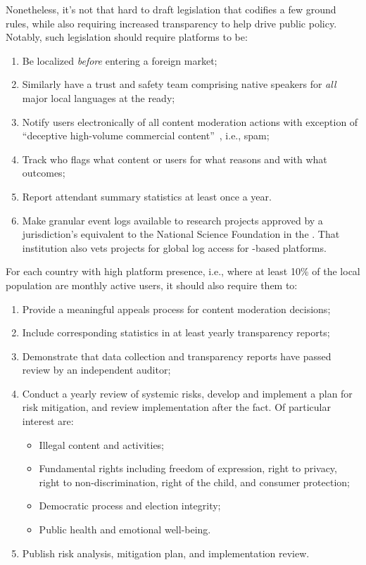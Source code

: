 Nonetheless, it's not that hard to draft legislation that codifies a few ground
rules, while also requiring increased transparency to help drive public policy.
Notably, such legislation should require platforms to be:
\begin{enumerate}
    \item Be localized \emph{before} entering a foreign market;
        \label{itm:law:localized}
    \item Similarly have a trust and safety team comprising native speakers for
        \emph{all} major local languages at the ready; \label{itm:law:team}
    \item Notify users electronically of all content moderation actions with
        exception of ``deceptive high-volume commercial
        content''~\cite{EuropeanParliamentAndCouncil2022}, i.e., spam;
    \item Track who flags what content or users for what reasons and with what
        outcomes;
    \item Report attendant summary statistics at least once a year.
    \item Make granular event logs available to research projects approved by a
        jurisdiction's equivalent to the National Science Foundation in the \US.
        That institution also vets projects for global log access for \US-based
        platforms.
        \label{itm:law:research}
\end{enumerate}
For each country with high platform presence, i.e., where at least 10\% of the
local population are monthly active users, it should also require them to:
\begin{enumerate}[resume]
    \item Provide a meaningful appeals process for content moderation decisions;
        \label{itm:law:appeals}
    \item Include corresponding statistics in at least yearly transparency
        reports;
    \item Demonstrate that data collection and transparency reports have passed
        review by an independent auditor;
    \item Conduct a yearly review of systemic risks, develop and implement a
        plan for risk mitigation, and review implementation after the fact. Of
        particular interest are:
        \begin{itemize}
            \item Illegal content and activities;
            \item Fundamental rights including freedom of expression, right to
                privacy, right to non-discrimination, right of the child, and
                consumer protection;
            \item Democratic process and election integrity;
            \item Public health and emotional well-being.
        \end{itemize}
    \item Publish risk analysis, mitigation plan, and implementation review.
        \label{itm:law:publicrisk}
\end{enumerate}
